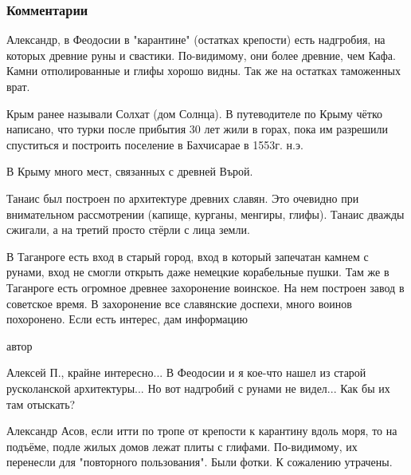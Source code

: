  
 
 
 
 
\subsubsection{Комментарии}
\label{sec:29_11_2020.sites.ru.zen_yandex.asov_alexandr.1.surozhskaja_rus.comments}

\begin{itemize}

Александр, в Феодосии в "карантине" (остатках крепости) есть надгробия, на
которых древние руны и свастики. По-видимому, они более древние, чем Кафа.
Камни отполированные и глифы хорошо видны. Так же на остатках таможенных врат.

Крым ранее называли Солхат (дом Солнца). В путеводителе по Крыму чётко
написано, что турки после прибытия 30 лет жили в горах, пока им разрешили
спуститься и построить поселение в Бахчисарае в 1553г. н.э.

В Крыму много мест, связанных с древней Върой.

Танаис был построен по архитектуре древних славян. Это очевидно при
внимательном рассмотрении (капище, курганы, менгиры, глифы). Танаис дважды
сжигали, а на третий просто стёрли с лица земли.

В Таганроге есть вход в старый город, вход в который запечатан камнем с рунами,
вход не смогли открыть даже немецкие корабельные пушки. Там же в Таганроге есть
огромное древнее захоронение воинское. На нем построен завод в советское время.
В захоронение все славянские доспехи, много воинов похоронено. Если есть
интерес, дам информацию

автор

Алексей П., крайне интересно... В Феодосии и я кое-что нашел из старой
русколанской архитектуры... Но вот надгробий с рунами не видел... Как бы их там
отыскать?


Александр Асов, если итти по тропе от крепости к карантину вдоль моря, то на
подъёме, подле жилых домов лежат плиты с глифами. По-видимому, их перенесли для
"повторного пользования". Были фотки. К сожалению утрачены.


\end{itemize}
